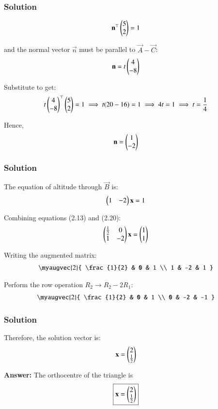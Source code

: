 \documentclass{beamer}
\numberwithin{equation}{section}
\begin{document}
\begin{frame}[fragile]
    \frametitle{Solution}
\begin{align}
\mathbf{n}^\top \begin{pmatrix}5 \\ 2\end{pmatrix} = 1
\end{align}

and the normal vector \( \vec{n} \) must be parallel to \( \vec{A} - \vec{C} \):
\begin{align}
\mathbf{n} = t \begin{pmatrix}4 \\ -8\end{pmatrix}
\end{align}

Substitute to get:
\begin{align}
t \begin{pmatrix}4 \\ -8\end{pmatrix}^\top \begin{pmatrix}5 \\ 2\end{pmatrix} = 1 \implies t (20 - 16) = 1 \implies 4 t = 1 \implies t = \frac{1}{4}
\end{align}

Hence,
\begin{align}
\mathbf{n} = \begin{pmatrix}1 \\ -2\end{pmatrix}
\end{align}
\end{frame}
\begin{frame}[fragile]
    \frametitle{Solution}
The equation of altitude through \( \vec{B} \) is:
\begin{align}
\begin{pmatrix}1 & -2\end{pmatrix} \mathbf{x} = 1
\end{align}

Combining equations (2.13) and (2.20):
\begin{align}
\begin{pmatrix}\frac{1}{2} & 0 \\ 1 & -2\end{pmatrix} \mathbf{x} = \begin{pmatrix}1 \\ 1\end{pmatrix}
\end{align}

Writing the augmented matrix:
\begin{align}
\myaugvec{2}{
\frac{1}{2} & 0 & 1 \\
1 & -2  & 1
}
\end{align}

Perform the row operation \( R_2 \to R_2 - 2 R_1 \):
\begin{align}
\myaugvec{2}{
\frac{1}{2} & 0 & 1 \\
0 & -2 & -1
}
\end{align}

\end{frame}
\begin{frame}[fragile]
    \frametitle{Solution}
Therefore, the solution vector is:
\begin{align}
\mathbf{x} = \begin{pmatrix}2 \\ \frac{1}{2}\end{pmatrix}
\end{align}

\textbf{Answer:} The orthocentre of the triangle is
\[
\boxed{
\mathbf{x} = \begin{pmatrix}2 \\ \frac{1}{2}\end{pmatrix}
}
\]
\end{frame}
\end{document}
